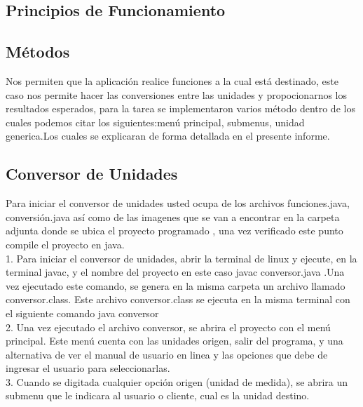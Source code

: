 \documentclass[times,12pt]{article}
\begin{document}
\subsection{Principios de Funcionamiento} 


\subsection{M\'etodos}

Nos permiten que la aplicaci\'on realice funciones a la cual est\'a destinado, este caso nos permite hacer las conversiones entre las unidades y propocionarnos los resultados esperados, para la tarea se implementaron varios m\'etodo dentro de los cuales podemos citar los siguientes:men\'u principal, submenus, unidad generica.Los cuales se explicaran de forma detallada en el presente informe.\\ 


\subsection{Conversor de Unidades}
\label{subsect:typing}

Para iniciar el conversor de unidades usted ocupa de los archivos funciones.java, conversi\'on.java  as\'i  como de las imagenes que se van a encontrar en la carpeta adjunta donde se ubica el proyecto programado , una vez verificado este punto compile el proyecto en java.\\

1. Para iniciar el conversor de unidades, abrir la terminal de linux y ejecute, en la terminal javac, y el nombre del proyecto en este caso javac conversor.java .Una vez ejecutado este comando, se genera en la misma carpeta un archivo llamado conversor.class. Este archivo conversor.class se ejecuta en la misma terminal con el siguiente comando java conversor \\

2. Una vez ejecutado el archivo conversor, se abrira el proyecto con el men\'u principal. Este men\'u cuenta con las unidades origen, salir del programa, y una alternativa de ver el manual de usuario en linea y las opciones que debe de ingresar el usuario para seleccionarlas.\\

3. Cuando se digitada cualquier  opci\'on origen (unidad de medida), se abrira un submenu que le indicara al usuario o cliente, cual es la unidad destino.\\
\end{document}
